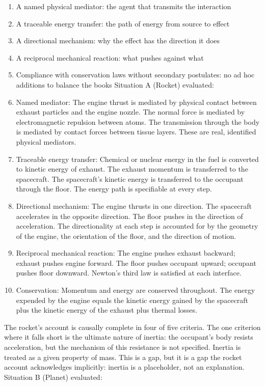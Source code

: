 \documentclass[11pt]{article}
\begin{document}
\begin{enumerate}
\def\labelenumi{\arabic{enumi}.}
\item
  A named physical mediator: the agent that transmits the interaction
\item
  A traceable energy transfer: the path of energy from source to effect
\item
  A directional mechanism: why the effect has the direction it does
\item
  A reciprocal mechanical reaction: what pushes against what
\item
  Compliance with conservation laws without secondary postulates: no ad hoc additions to balance the books Situation A (Rocket) evaluated:
\item
  Named mediator: The engine thrust is mediated by physical contact between exhaust particles and the engine nozzle. The normal force is mediated by electromagnetic repulsion between atoms. The transmission through the body is mediated by contact forces between tissue layers. These are real, identified physical mediators.
\item
  Traceable energy transfer: Chemical or nuclear energy in the fuel is converted to kinetic energy of exhaust. The exhaust momentum is transferred to the spacecraft. The spacecraft's kinetic energy is transferred to the occupant through the floor. The energy path is specifiable at every step.
\item
  Directional mechanism: The engine thrusts in one direction. The spacecraft accelerates in the opposite direction. The floor pushes in the direction of acceleration. The directionality at each step is accounted for by the geometry of the engine, the orientation of the floor, and the direction of motion.
\item
  Reciprocal mechanical reaction: The engine pushes exhaust backward; exhaust pushes engine forward. The floor pushes occupant upward; occupant pushes floor downward. Newton's third law is satisfied at each interface.
\item
  Conservation: Momentum and energy are conserved throughout. The energy expended by the engine equals the kinetic energy gained by the spacecraft plus the kinetic energy of the exhaust plus thermal losses.
\end{enumerate}

The rocket's account is causally complete in four of five criteria. The one criterion where it falls short is the ultimate nature of inertia: the occupant's body resists acceleration, but the mechanism of this resistance is not specified. Inertia is treated as a given property of mass. This is a gap, but it is a gap the rocket account acknowledges implicitly: inertia is a placeholder, not an explanation. Situation B (Planet) evaluated:
\end{document}
